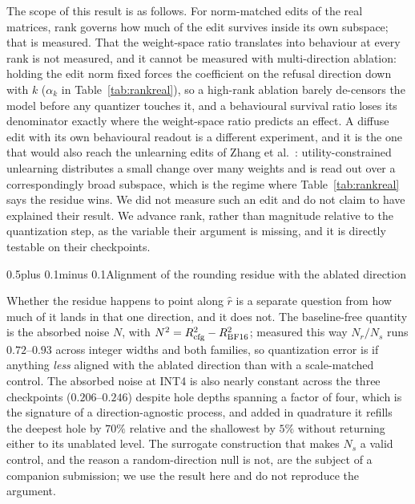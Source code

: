 \documentclass[conference,compsoc,letterpaper]{IEEEtran}
\makeatletter
\def\subsection{\@startsection{subsection}{2}{\z@}{1\baselineskip plus 0.25\baselineskip minus 0.25\baselineskip}%
{0.5\baselineskip plus 0.1\baselineskip minus 0.1\baselineskip}{\normalfont\sublargesize\bfseries}}%
\makeatother
\begin{document}
The scope of this result is as follows. For norm-matched edits of the real matrices, rank governs how much of the edit survives inside its own subspace; that is measured. That the weight-space ratio translates into behaviour at every rank is not measured, and it cannot be measured with multi-direction ablation: holding the edit norm fixed forces the coefficient on the refusal direction down with $k$ ($\alpha_k$ in Table~\ref{tab:rankreal}), so a high-rank ablation barely de-censors the model before any quantizer touches it, and a behavioural survival ratio loses its denominator exactly where the weight-space ratio predicts an effect. A diffuse edit with its own behavioural readout is a different experiment, and it is the one that would also reach the unlearning edits of Zhang et al.~\cite{zhang2025unlearnquant}: utility-constrained unlearning distributes a small change over many weights and is read out over a correspondingly broad subspace, which is the regime where Table~\ref{tab:rankreal} says the residue wins. We did not measure such an edit and do not claim to have explained their result. We advance rank, rather than magnitude relative to the quantization step, as the variable their argument is missing, and it is directly testable on their checkpoints.

\subsection{Alignment of the rounding residue with the ablated direction} \label{sec:noise}

Whether the residue happens to point along $\hat{r}$ is a separate question from how much of it lands in that one direction, and it does not. The baseline-free quantity is the absorbed noise $N$, with $N^2 = R_{\rm cfg}^2 - R_{\rm BF16}^2$; measured this way $N_r/N_s$ runs $0.72$--$0.93$ across integer widths and both families, so quantization error is if anything \emph{less} aligned with the ablated direction than with a scale-matched control. The absorbed noise at INT4 is also nearly constant across the three checkpoints ($0.206$--$0.246$) despite hole depths spanning a factor of four, which is the signature of a direction-agnostic process, and added in quadrature it refills the deepest hole by $70\%$ relative and the shallowest by $5\%$ without returning either to its unablated level. The surrogate construction that makes $N_s$ a valid control, and the reason a random-direction null is not, are the subject of a companion submission; we use the result here and do not reproduce the argument.
\end{document}
